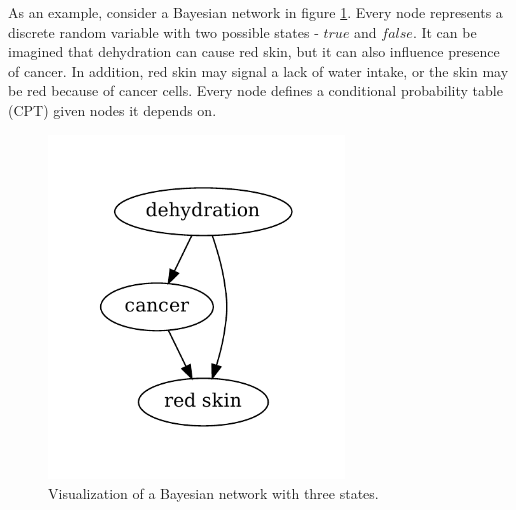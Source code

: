 \documentclass[thesis=B,english]{FITthesis}[2012/06/26]
\begin{document}
As an example, consider a Bayesian network in figure \ref{fig:bn}. Every node represents a discrete random variable with two possible states - $true$ and $false$. It can be imagined that dehydration can cause red skin, but it can also influence presence of cancer. In addition, red skin may signal a lack of water intake, or the skin may be red because of cancer cells. Every node defines a conditional probability table (CPT) given nodes it depends on.

\begin{figure}
	\centering
 	\includegraphics[width=0.7\textwidth]{bn}
 	\caption{Visualization of a Bayesian network with three states.}
 	\label{fig:bn}
\end{figure}
\end{document}

